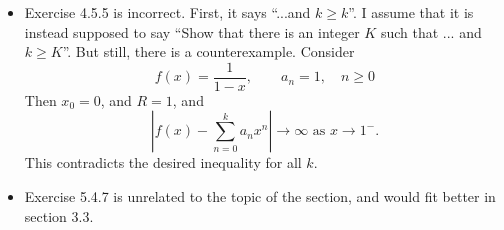 \documentclass{article}
\begin{document}
\begin{itemize}

\item {
        Exercise 4.5.5 is incorrect. First, it says ``...and $k \geq k$''. I assume that it is instead supposed to say ``Show that there is an integer $K$ such that ... and $k \geq K$''. But still, there is a counterexample. Consider
    \begin{equation*}
        f(x) = \frac 1 {1 - x}, \qquad a_n = 1, \quad n \geq 0
    \end{equation*}
    Then $x_0 = 0$, and $R = 1$, and
    \begin{equation*}
        \left|f(x) - \sum_{n = 0}^k a_n x^n\right| \to \infty \text{ as } x \to 1^-.
    \end{equation*}
    This contradicts the desired inequality for all $k$.
}

\item Exercise 5.4.7 is unrelated to the topic of the section, and would fit better in section 3.3.

\end{itemize}
\end{document}
